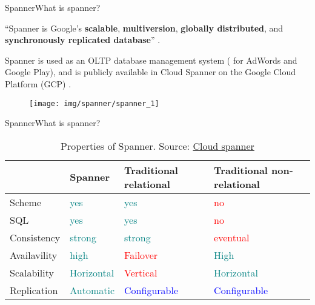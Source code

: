 \documentclass[10pt]{beamer}
\newcommand{\chref}[2]{\href{#1}{{\usebeamercolor[bg]{Feather}#2}}}
\newcommand{\chref}[3][blue]{\href{#2}{\color{#1}{#3}}}%
\newcommand{\1}{
        	\setbeamertemplate{background}{
        		\texttt{[image: img/1]}
        		\tikz[overlay] \fill[fill opacity=0.75,fill=white] (0,0) rectangle (-\paperwidth,\paperheight);
        	}
}
\begin{document}
\begin{frame}{Spanner}{What is spanner?}		
	\begin{block}{}
		``Spanner is Google’s \textbf{scalable}, \textbf{multiversion}, \textbf{globally distributed}, and \textbf{synchronously replicated database}'' \cite{corbett2013spanner}.
	\end{block}	
	\pause
	\begin{block}{}
		Spanner is used as an OLTP database management system ( for AdWords and Google Play), and is publicly available in Cloud Spanner on the Google Cloud Platform (GCP) \cite{bacon2017spanner}.
	\end{block}

	\begin{figure}[]
		\centering
		\texttt{[image: img/spanner/spanner\_1]}
	\end{figure}
\end{frame}

\begin{frame}{Spanner}{What is spanner?}		
	\begin{table}
		\centering	
		\begin{tabular}{ p{1.8cm} p{1.8cm} p{2cm} p{2.5cm} }
			\hline 
			& \textbf{Spanner} & \textbf{Traditional relational} & \textbf{Traditional non-relational}   \\
			\hline 
			Scheme  		& \textcolor{teal}{yes} & \textcolor{teal}{yes} & \textcolor{red}{no} \\
			SQL 			& \textcolor{teal}{yes} & \textcolor{teal}{yes} & \textcolor{red}{no} \\
			Consistency		& \textcolor{teal}{strong} &  \textcolor{teal}{strong}  & \textcolor{red}{eventual} \\
			Availavility	& \textcolor{teal}{high} & \textcolor{red}{Failover} &  \textcolor{teal}{High} \\
			Scalability		& \textcolor{teal}{Horizontal} & \textcolor{red}{Vertical} &  \textcolor{teal}{Horizontal} \\
			Replication		& \textcolor{teal}{Automatic} &  \textcolor{blue}{Configurable} & \textcolor{blue}{Configurable} \\
			\hline 
		\end{tabular}
		\caption{Properties of Spanner. Source: \chref{https://www.youtube.com/watch?v=IFbydfGV2lQ}{Cloud spanner}}
	\end{table}
\end{frame}
\end{document}
